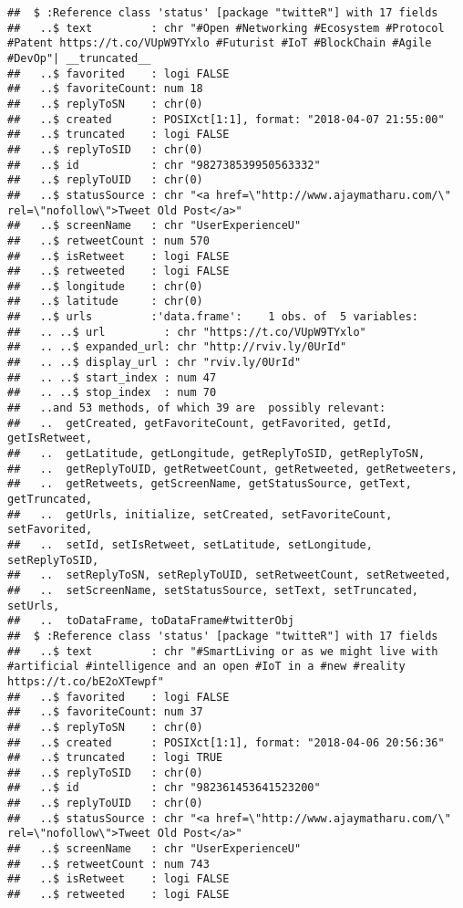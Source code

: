 \documentclass[]{article}
\begin{document}
\begin{verbatim}
##  $ :Reference class 'status' [package "twitteR"] with 17 fields
##   ..$ text         : chr "#Open #Networking #Ecosystem #Protocol #Patent https://t.co/VUpW9TYxlo #Futurist #IoT #BlockChain #Agile #DevOp"| __truncated__
##   ..$ favorited    : logi FALSE
##   ..$ favoriteCount: num 18
##   ..$ replyToSN    : chr(0) 
##   ..$ created      : POSIXct[1:1], format: "2018-04-07 21:55:00"
##   ..$ truncated    : logi FALSE
##   ..$ replyToSID   : chr(0) 
##   ..$ id           : chr "982738539950563332"
##   ..$ replyToUID   : chr(0) 
##   ..$ statusSource : chr "<a href=\"http://www.ajaymatharu.com/\" rel=\"nofollow\">Tweet Old Post</a>"
##   ..$ screenName   : chr "UserExperienceU"
##   ..$ retweetCount : num 570
##   ..$ isRetweet    : logi FALSE
##   ..$ retweeted    : logi FALSE
##   ..$ longitude    : chr(0) 
##   ..$ latitude     : chr(0) 
##   ..$ urls         :'data.frame':    1 obs. of  5 variables:
##   .. ..$ url         : chr "https://t.co/VUpW9TYxlo"
##   .. ..$ expanded_url: chr "http://rviv.ly/0UrId"
##   .. ..$ display_url : chr "rviv.ly/0UrId"
##   .. ..$ start_index : num 47
##   .. ..$ stop_index  : num 70
##   ..and 53 methods, of which 39 are  possibly relevant:
##   ..  getCreated, getFavoriteCount, getFavorited, getId, getIsRetweet,
##   ..  getLatitude, getLongitude, getReplyToSID, getReplyToSN,
##   ..  getReplyToUID, getRetweetCount, getRetweeted, getRetweeters,
##   ..  getRetweets, getScreenName, getStatusSource, getText, getTruncated,
##   ..  getUrls, initialize, setCreated, setFavoriteCount, setFavorited,
##   ..  setId, setIsRetweet, setLatitude, setLongitude, setReplyToSID,
##   ..  setReplyToSN, setReplyToUID, setRetweetCount, setRetweeted,
##   ..  setScreenName, setStatusSource, setText, setTruncated, setUrls,
##   ..  toDataFrame, toDataFrame#twitterObj
##  $ :Reference class 'status' [package "twitteR"] with 17 fields
##   ..$ text         : chr "#SmartLiving or as we might live with #artificial #intelligence and an open #IoT in a #new #reality https://t.co/bE2oXTewpf"
##   ..$ favorited    : logi FALSE
##   ..$ favoriteCount: num 37
##   ..$ replyToSN    : chr(0) 
##   ..$ created      : POSIXct[1:1], format: "2018-04-06 20:56:36"
##   ..$ truncated    : logi TRUE
##   ..$ replyToSID   : chr(0) 
##   ..$ id           : chr "982361453641523200"
##   ..$ replyToUID   : chr(0) 
##   ..$ statusSource : chr "<a href=\"http://www.ajaymatharu.com/\" rel=\"nofollow\">Tweet Old Post</a>"
##   ..$ screenName   : chr "UserExperienceU"
##   ..$ retweetCount : num 743
##   ..$ isRetweet    : logi FALSE
##   ..$ retweeted    : logi FALSE

\end{verbatim}
\end{document}
